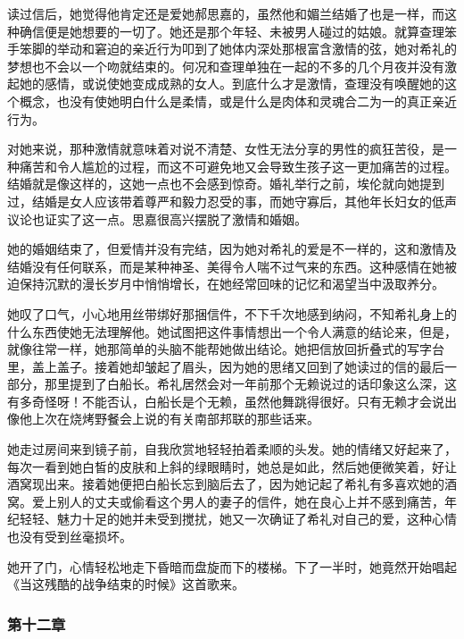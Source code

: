 \par 读过信后，她觉得他肯定还是爱她郝思嘉的，虽然他和媚兰结婚了也是一样，而这种确信便是她想要的一切了。她还是那个年轻、未被男人碰过的姑娘。就算查理笨手笨脚的举动和窘迫的亲近行为叩到了她体内深处那根富含激情的弦，她对希礼的梦想也不会以一个吻就结束的。何况和查理单独在一起的不多的几个月夜并没有激起她的感情，或说使她变成成熟的女人。到底什么才是激情，查理没有唤醒她的这个概念，也没有使她明白什么是柔情，或是什么是肉体和灵魂合二为一的真正亲近行为。
\par 对她来说，那种激情就意味着对说不清楚、女性无法分享的男性的疯狂苦役，是一种痛苦和令人尴尬的过程，而这不可避免地又会导致生孩子这一更加痛苦的过程。结婚就是像这样的，这她一点也不会感到惊奇。婚礼举行之前，埃伦就向她提到过，结婚是女人应该带着尊严和毅力忍受的事，而她守寡后，其他年长妇女的低声议论也证实了这一点。思嘉很高兴摆脱了激情和婚姻。
\par 她的婚姻结束了，但爱情并没有完结，因为她对希礼的爱是不一样的，这和激情及结婚没有任何联系，而是某种神圣、美得令人喘不过气来的东西。这种感情在她被迫保持沉默的漫长岁月中悄悄增长，在她经常回味的记忆和渴望当中汲取养分。
\par 她叹了口气，小心地用丝带绑好那捆信件，不下千次地感到纳闷，不知希礼身上的什么东西使她无法理解他。她试图把这件事情想出一个令人满意的结论来，但是，就像往常一样，她那简单的头脑不能帮她做出结论。她把信放回折叠式的写字台里，盖上盖子。接着她却皱起了眉头，因为她的思绪又回到了她读过的信的最后一部分，那里提到了白船长。希礼居然会对一年前那个无赖说过的话印象这么深，这有多奇怪呀！不能否认，白船长是个无赖，虽然他舞跳得很好。只有无赖才会说出像他上次在烧烤野餐会上说的有关南部邦联的那些话来。
\par 她走过房间来到镜子前，自我欣赏地轻轻拍着柔顺的头发。她的情绪又好起来了，每次一看到她白皙的皮肤和上斜的绿眼睛时，她总是如此，然后她便微笑着，好让酒窝现出来。接着她便把白船长忘到脑后去了，因为她记起了希礼有多喜欢她的酒窝。爱上别人的丈夫或偷看这个男人的妻子的信件，她在良心上并不感到痛苦，年纪轻轻、魅力十足的她并未受到搅扰，她又一次确证了希礼对自己的爱，这种心情也没有受到丝毫损坏。
\par 她开了门，心情轻松地走下昏暗而盘旋而下的楼梯。下了一半时，她竟然开始唱起《当这残酷的战争结束的时候》这首歌来。

\subsubsection{第十二章}

